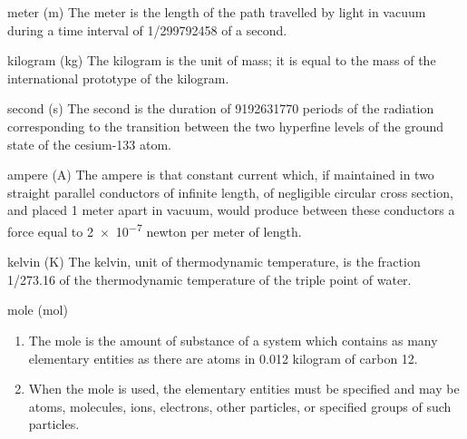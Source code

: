 \documentclass[avery5371,grid]{flashcards}
\begin{document}
\begin{flashcard}[Definitions]{meter (m)}
\vspace{\fill}
The meter is the length of the path travelled by light in vacuum during a time interval of 1/\num{299 792 458} of a second.\cite{sp330}
\vspace{\fill}
\end{flashcard}

\begin{flashcard}[Definitions]{kilogram (kg)}
\vspace{\fill}
The kilogram is the unit of mass; it is equal to the mass of the international prototype of the kilogram.\cite{sp330}
\vspace{\fill}
\end{flashcard}

\begin{flashcard}[Definitions]{second (s)}
\vspace{\fill}
The second is the duration of \num{9 192 631 770} periods of the radiation corresponding to the transition between the two hyperfine levels of the ground state of the cesium-133 atom.\cite{sp330}
\vspace{\fill}
\end{flashcard}

\begin{flashcard}[Definitions]{ampere (A)}
\vspace{\fill}
The ampere is that constant current which, if maintained in two straight parallel conductors of infinite length, of negligible circular cross section, and placed 1 meter apart in vacuum, would produce between these conductors a force equal to \num{2e-7} newton per meter of length.\cite{sp330}
\vspace{\fill}
\end{flashcard}

\begin{flashcard}[Definitions]{kelvin (K)}
\vspace{\fill}
The kelvin, unit of thermodynamic temperature, is the fraction 1/273.16 of the thermodynamic temperature of the triple point of water.\cite{sp330}
\vspace{\fill}
\end{flashcard}

\begin{flashcard}[Definitions]{mole (mol)}
\vspace{\fill}
\begin{enumerate} %
    \item  The mole is the amount of substance of a system which contains as many elementary entities as there are atoms in 0.012 kilogram of carbon 12.
    \item  When the mole is used, the elementary entities must be specified and may be atoms, molecules, ions, electrons, other particles, or specified groups of such particles.\cite{sp330}
\end{enumerate}
\vspace{\fill}
\end{flashcard}
\end{document}
